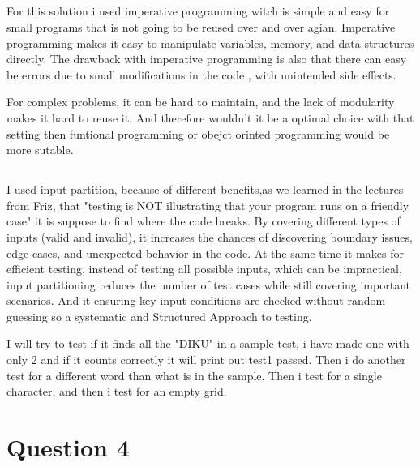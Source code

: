 \documentclass{article}
\begin{document}



\subsection{}

For this solution i used imperative programming witch is simple and easy for small programs that is not going to be reused over and over agian. Imperative programming makes it easy to manipulate variables, memory, and data structures directly. The drawback with imperative programming is also that there can easy be errors due to small modifications in the code , with unintended side effects. 

For complex problems, it can be hard to maintain, and the lack of modularity makes it hard to reuse it. And therefore wouldn't it be a optimal choice with that setting then funtional programming or obejct orinted programming would be more sutable.



\subsection{}

I used input partition, because of different benefits,as we learned in the lectures from Friz, that "testing is NOT illustrating that your program runs on a friendly case" it is suppose to find where the code breaks. By covering different types of inputs (valid and invalid), it increases the chances of discovering boundary issues, edge cases, and unexpected behavior in the code. At the same time it makes for efficient testing, instead of testing all possible inputs, which can be impractical, input partitioning reduces the number of test cases while still covering important scenarios. And it ensuring key input conditions are checked without random guessing so a systematic and Structured Approach to testing. 

I will try to test if it finds all the "DIKU" in a sample test, i have made one with only 2 and if it counts correctly it will print out test1 passed. Then i do another test for a different word than what is in the sample. Then i test for a single character, and then i test for an empty grid.


\section{Question 4}
\end{document}
